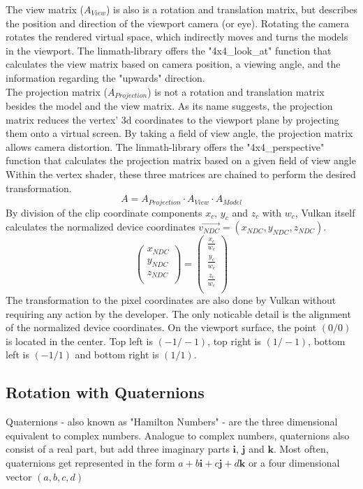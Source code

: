The view matrix ($A_{View}$) is also is a rotation and translation matrix, but describes the position and direction of the viewport camera (or eye). Rotating the camera rotates the rendered virtual space, which indirectly moves and turns the models in the viewport. The linmath-library offers the "4x4\_look\_at" function that calculates the view matrix based on camera position, a viewing angle, and the information regarding the "upwards" direction.\\
The projection matrix ($A_{Projection}$)  is not a rotation and translation matrix besides the model and the view matrix. As its name suggests, the projection matrix reduces the vertex' 3d coordinates to the viewport plane by projecting them onto a virtual screen. By taking a field of view angle, the projection matrix allows camera distortion. The linmath-library offers the "4x4\_perspective" function that calculates the projection matrix based on a given field of view angle 
Within the vertex shader, these three matrices are chained to perform the desired transformation.
\begin{equation*}  
    A = A_{Projection} \cdot A_{View} \cdot A_{Model}
\end{equation*}
By division of the clip coordinate components $x_{c}$, $y_{c}$ and $z_{c}$ with $w_{c}$, Vulkan itself calculates the normalized device coordinates $\overrightarrow{v_{NDC}} = (x_{NDC}, y_{NDC}, z_{NDC})$.
\begin{equation*}
    \begin{pmatrix}
    x_{NDC}  \\
    y_{NDC}  \\
    z_{NDC}  \\
    \end{pmatrix} 
    =
    \begin{pmatrix}
        \frac{x_{c}}{w_{c}}  \\
        \frac{y_{c}}{w_{c}}  \\
        \frac{z_{c}}{w_{c}}  \\        
        \end{pmatrix}     
\end{equation*}
The transformation to the pixel coordinates are also done by Vulkan without requiring any action by the developer. The only noticable detail is the alignment of the normalized device coordinates. On the viewport surface, the point $(0 / 0)$ is located in the center. Top left is $(-1 / -1)$, top right is $(1 / -1)$, bottom left is $(-1 / 1)$ and bottom right is $(1 / 1)$.

\subsection{Rotation with Quaternions}
Quaternions - also known as "Hamilton Numbers" - are the three dimensional equivalent to complex numbers. Analogue to complex numbers, quaternions also consist of a real part, but add three imaginary parts $\textbf{i}$, $\textbf{j}$ and $\textbf{k}$. Most often, quaternions get represented in the form $a+b\textbf{i}+c\textbf{j}+d\textbf{k}$ or a four dimensional vector $(a, b, c, d)$